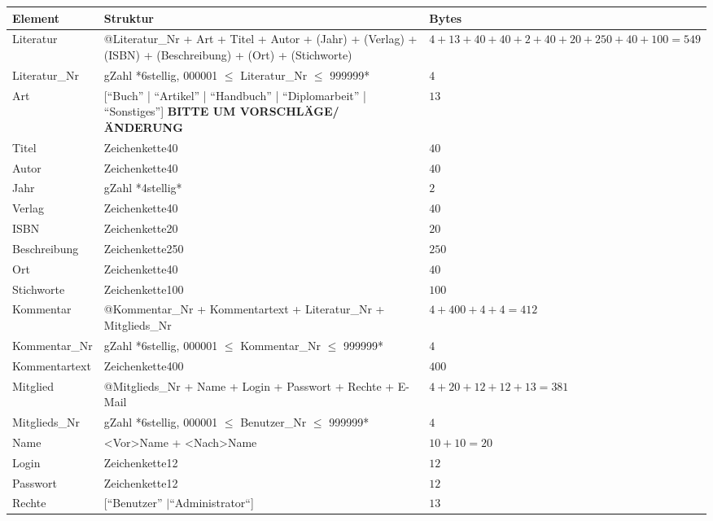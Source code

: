 \begin{longtable}{|l|p{6.0cm}|p{2cm}|}
\hline
Element & Struktur & Bytes\\
\hline\hline
\endhead

Literatur & @Literatur\_Nr + Art + Titel + Autor + (Jahr) + (Verlag) + (ISBN) + (Beschreibung) + (Ort) + (Stichworte) & $4 + 13 + 40 + 40 + 2 + 40 + 20 + 250 + 40 + 100 = 549$ \\
\hline
Literatur\_Nr & gZahl *6stellig, 000001 $\leq$ Literatur\_Nr $\leq$ 999999*  & $4$\\
\hline
Art & [``Buch'' | ``Artikel'' | ``Handbuch'' | ``Diplomarbeit'' | ``Sonstiges''] \textbf{BITTE UM VORSCHLÄGE/ÄNDERUNG}  & $13$\\
\hline
Titel & Zeichenkette40 & $40$ \\
\hline
Autor & Zeichenkette40 & $40$\\
\hline
Jahr & gZahl *4stellig* & $2$\\
\hline
Verlag & Zeichenkette40 & $40$ \\
\hline
ISBN & Zeichenkette20 & $20$  \\
\hline
Beschreibung & Zeichenkette250 & $250$ \\
\hline
Ort & Zeichenkette40 & $40$ \\
\hline
Stichworte & Zeichenkette100 & $100$\\
\hline\hline

Kommentar & @Kommentar\_Nr + Kommentartext + Literatur\_Nr + Mitglieds\_Nr & $4 + 400 + 4 + 4 = 412 $\\
\hline
Kommentar\_Nr & gZahl *6stellig, 000001 $\leq$ Kommentar\_Nr $\leq$ 999999* & $4$ \\
\hline
Kommentartext & Zeichenkette400 & $400$\\
\hline\hline

Mitglied  & @Mitglieds\_Nr  + Name + Login + Passwort + Rechte + E-Mail & $4 + 20 + 12 + 12 + 13 = 381 $\\
\hline
Mitglieds\_Nr & gZahl *6stellig, 000001 $\leq$ Benutzer\_Nr $\leq$ 999999* & $4$ \\ 
\hline
Name & <Vor>Name + <Nach>Name & $10 + 10 = 20$\\
\hline
Login & Zeichenkette12 & $12$\\
\hline
Passwort & Zeichenkette12 & $12$\\
\hline
Rechte & [``Benutzer'' $\mid $``Administrator``] & $13$ \\
\hline\hline


\end{longtable}
